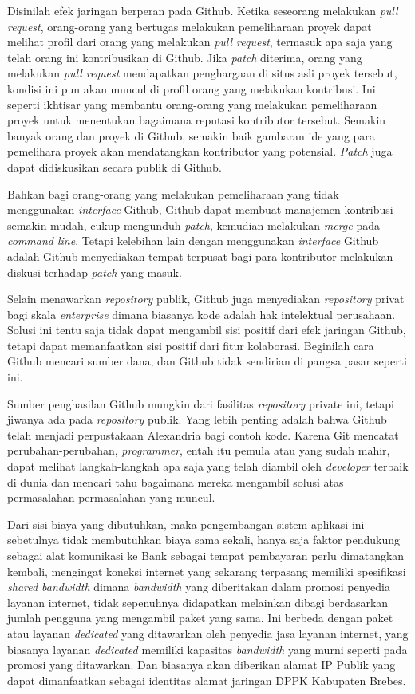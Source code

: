 \documentclass[pdftex,12pt, oneside]{article}
\begin{document}
Disinilah efek jaringan berperan pada Github. Ketika seseorang melakukan \textit{pull request}, orang-orang yang bertugas melakukan pemeliharaan proyek dapat melihat profil dari orang yang melakukan \textit{pull request}, termasuk apa saja yang telah orang ini kontribusikan di Github. Jika \textit{patch} diterima, orang yang melakukan \textit{pull request} mendapatkan penghargaan di situs asli proyek tersebut, kondisi ini pun akan muncul di profil orang yang melakukan kontribusi. Ini seperti ikhtisar yang membantu orang-orang yang melakukan pemeliharaan proyek untuk menentukan bagaimana reputasi kontributor tersebut. Semakin banyak orang dan proyek di Github, semakin baik gambaran ide yang para pemelihara proyek akan mendatangkan kontributor yang potensial. \textit{Patch} juga dapat didiskusikan secara publik di Github.

Bahkan bagi orang-orang yang melakukan pemeliharaan yang tidak menggunakan \textit{interface} Github, Github dapat membuat manajemen kontribusi semakin mudah, cukup mengunduh \textit{patch}, kemudian melakukan \textit{merge} pada \textit{command line}. Tetapi kelebihan lain dengan menggunakan \textit{interface} Github adalah Github menyediakan tempat terpusat bagi para kontributor melakukan diskusi terhadap \textit{patch} yang masuk.

Selain menawarkan \textit{repository} publik, Github juga menyediakan \textit{repository} privat bagi skala \textit{enterprise} dimana biasanya kode adalah hak intelektual perusahaan. Solusi ini tentu saja tidak dapat mengambil sisi positif dari efek jaringan Github, tetapi dapat memanfaatkan sisi positif dari fitur kolaborasi. Beginilah cara Github mencari sumber dana, dan Github tidak sendirian di pangsa pasar seperti ini.

Sumber penghasilan Github mungkin dari fasilitas \textit{repository} private ini, tetapi jiwanya ada pada \textit{repository} publik. Yang lebih penting adalah bahwa Github telah menjadi perpustakaan Alexandria bagi contoh kode. Karena Git mencatat perubahan-perubahan, \textit{programmer}, entah itu pemula atau yang sudah mahir, dapat melihat langkah-langkah apa saja yang telah diambil oleh \textit{developer} terbaik di dunia dan mencari tahu bagaimana mereka mengambil solusi atas permasalahan-permasalahan yang muncul. 

Dari sisi biaya yang dibutuhkan, maka pengembangan sistem aplikasi ini sebetulnya tidak membutuhkan biaya sama sekali, hanya saja faktor pendukung sebagai alat komunikasi ke Bank sebagai tempat pembayaran perlu dimatangkan kembali, mengingat koneksi internet yang sekarang terpasang memiliki spesifikasi \textit{shared bandwidth} dimana \textit{bandwidth} yang diberitakan dalam promosi penyedia layanan internet, tidak sepenuhnya didapatkan melainkan dibagi berdasarkan jumlah pengguna yang mengambil paket yang sama. Ini berbeda dengan paket atau layanan \textit{dedicated} yang ditawarkan oleh penyedia jasa layanan internet, yang biasanya layanan \textit{dedicated} memiliki kapasitas \textit{bandwidth} yang murni seperti pada promosi yang ditawarkan. Dan biasanya akan diberikan alamat IP Publik yang dapat dimanfaatkan sebagai identitas alamat jaringan DPPK Kabupaten Brebes.
\end{document}
